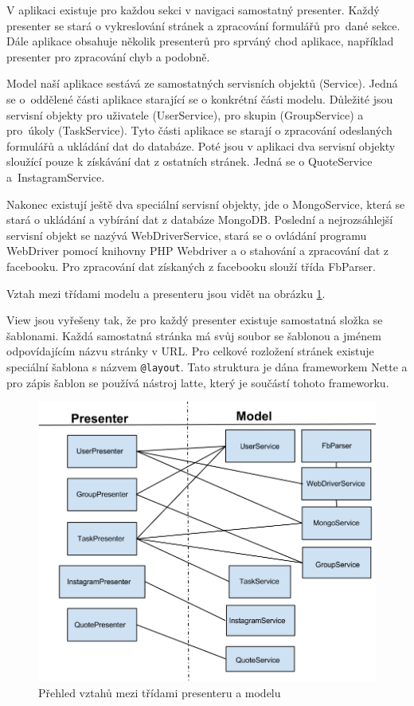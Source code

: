 \documentclass[thesis=M,czech]{FITthesis}[2013/05/10]
\begin{document}
V aplikaci existuje pro každou sekci v navigaci samostatný presenter. Každý presenter se stará o vykreslování stránek  a zpracování formulářů pro~dané sekce. Dále aplikace obsahuje několik presenterů pro sprváný chod aplikace, například presenter pro zpracování chyb a podobně.

Model naší aplikace sestává ze samostatných servisních objektů (Service). Jedná se o~oddělené části aplikace starající se o konkrétní části modelu. Důležité jsou servisní objekty pro uživatele (UserService), pro skupin (GroupService) a pro~úkoly (TaskService). Tyto části aplikace se starají o zpracování odeslaných formulářů a ukládání dat do databáze. Poté jsou v aplikaci dva servisní objekty sloužící pouze k získávání dat z ostatních stránek. Jedná se o QuoteService a~InstagramService. 

Nakonec existují ještě dva speciální servisní objekty, jde o MongoService, která se stará o ukládání a vybírání dat z databáze MongoDB. Poslední a nejrozsáhlejší servisní objekt se nazývá WebDriverService, stará se o ovládání programu WebDriver pomocí knihovny PHP Webdriver a o stahování a zpracování dat z facebooku. Pro zpracování dat získaných z facebooku slouží třída FbParser.

Vztah mezi třídami modelu a presenteru jsou vidět na obrázku \ref{fig:fcModelPresenter}.

View jsou vyřešeny tak, že pro každý presenter existuje samostatná složka se šablonami. Každá samostatná stránka má svůj soubor se šablonou a jménem odpovídajícím názvu stránky v URL. Pro celkové rozložení stránek existuje speciální šablona s názvem \verb|@layout|. Tato struktura je dána frameworkem Nette a pro zápis šablon se používá nástroj latte, který je součástí tohoto frameworku. 

\begin{figure}[h]
\begin{center}
\includegraphics[width=5in]{figures/fcModelPresenter.png}
\caption{Přehled vztahů mezi třídami presenteru a modelu}
\label{fig:fcModelPresenter}
\end{center}
\end{figure}
\end{document}
